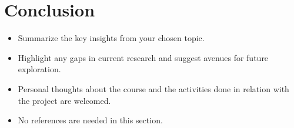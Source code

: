 \documentclass{Interspeech2024}
\begin{document}
\section{Conclusion}

\begin{itemize}
    \item Summarize the key insights from your chosen topic.
    \item Highlight any gaps in current research and suggest avenues for future exploration.
    \item Personal thoughts about the course and the activities done in relation with the project are welcomed.
    \item No references are needed in this section.
\end{itemize}






\end{document}
